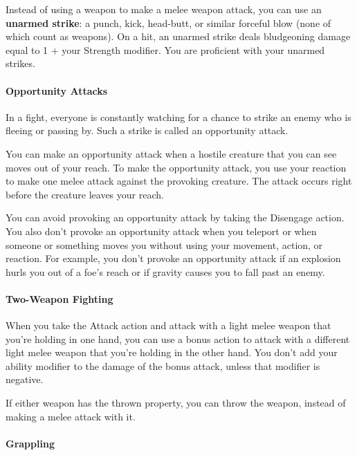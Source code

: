 \documentclass[
]{article}
\begin{document}
Instead of using a weapon to make a melee weapon attack, you can use an
\textbf{unarmed strike}: a punch, kick, head-butt, or similar forceful
blow (none of which count as weapons). On a hit, an unarmed strike deals
bludgeoning damage equal to 1 + your Strength modifier. You are
proficient with your unarmed strikes.

\hypertarget{opportunity-attacks}{%
\paragraph{Opportunity Attacks}\label{opportunity-attacks}}

In a fight, everyone is constantly watching for a chance to strike an
enemy who is fleeing or passing by. Such a strike is called an
opportunity attack.

You can make an opportunity attack when a hostile creature that you can
see moves out of your reach. To make the opportunity attack, you use
your reaction to make one melee attack against the provoking creature.
The attack occurs right before the creature leaves your reach.

You can avoid provoking an opportunity attack by taking the Disengage
action. You also don't provoke an opportunity attack when you teleport
or when someone or something moves you without using your movement,
action, or reaction. For example, you don't provoke an opportunity
attack if an explosion hurls you out of a foe's reach or if gravity
causes you to fall past an enemy.

\hypertarget{two-weapon-fighting}{%
\paragraph{Two-Weapon Fighting}\label{two-weapon-fighting}}

When you take the Attack action and attack with a light melee weapon
that you're holding in one hand, you can use a bonus action to attack
with a different light melee weapon that you're holding in the other
hand. You don't add your ability modifier to the damage of the bonus
attack, unless that modifier is negative.

If either weapon has the thrown property, you can throw the weapon,
instead of making a melee attack with it.

\hypertarget{grappling}{%
\paragraph{Grappling}\label{grappling}}
\end{document}
